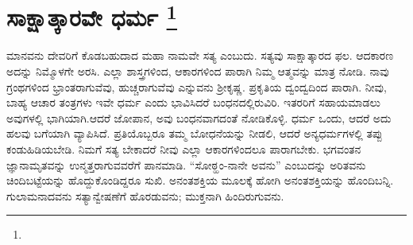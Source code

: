 
\chapter[ಸಾಕ್ಷಾತ್ಕಾರವೇ ಧರ್ಮ ]{ಸಾಕ್ಷಾತ್ಕಾರವೇ ಧರ್ಮ \protect\footnote{}}

ಮಾನವನು ದೇವರಿಗೆ ಕೊಡಬಹುದಾದ ಮಹಾ ನಾಮವೇ ಸತ್ಯ ಎಂಬುದು. ಸತ್ಯವು ಸಾಕ್ಷಾತ್ಕಾರದ ಫಲ. ಆದಕಾರಣ ಅದನ್ನು ನಿಮ್ಮೊಳಗೇ ಅರಸಿ. ಎಲ್ಲಾ ಶಾಸ್ತ್ರಗಳಿಂದ, ಆಕಾರಗಳಿಂದ ಪಾರಾಗಿ ನಿಮ್ಮ ಆತ್ಮವನ್ನು ಮಾತ್ರ ನೋಡಿ. ನಾವು ಗ್ರಂಥಗಳಿಂದ ಭ್ರಾಂತರಾಗುವೆವು, ಹುಚ್ಚರಾಗುವೆವು ಎನ್ನುವನು ಶ‍್ರೀಕೃಷ್ಣ. ಪ್ರಕೃತಿಯ ದ್ವಂದ್ವದಿಂದ ಪಾರಾಗಿ. ನೀವು, ಬಾಹ್ಯ ಆಚಾರ ತಂತ್ರಗಳು ಇವೇ ಧರ್ಮ ಎಂದು ಭಾವಿಸಿದರೆ ಬಂಧನದಲ್ಲಿರುವಿರಿ. ಇತರರಿಗೆ ಸಹಾಯಮಾಡಲು ಅವುಗಳಲ್ಲಿ ಭಾಗಿಯಾಗಿ.ಆದರೆ ಜೋಪಾನ, ಅವು ಬಂಧನವಾಗದಂತೆ ನೋಡಿಕೊಳ್ಳಿ. ಧರ್ಮ ಒಂದು, ಆದರೆ ಅದು ಹಲವು ಬಗೆಯಾಗಿ ವ್ಯಾಪಿಸಿದೆ. ಪ್ರತಿಯೊಬ್ಬರೂ ತಮ್ಮ ಬೋಧನೆಯನ್ನು ನೀಡಲಿ, ಆದರೆ ಅನ್ಯಧರ್ಮಗಳಲ್ಲಿ ತಪ್ಪು ಕಂಡುಹಿಡಿಯಬೇಡಿ. ನಿಮಗೆ ಸತ್ಯ ಬೇಕಾದರೆ ನೀವು ಎಲ್ಲಾ ಆಕಾರಗಳಿಂದಲೂ ಪಾರಾಗಬೇಕು. ಭಗವಂತನ ಜ್ಞಾನಾಮೃತವನ್ನು ಉನ್ಮತ್ತರಾಗುವವರೆಗೆ ಪಾನಮಾಡಿ. “ಸೋಠ್ಹಂ-ನಾನೇ ಅವನು” ಎಂಬುದನ್ನು ಅರಿತವನು ಚಿಂದಿಬಟ್ಟೆಯನ್ನು ಹೊದ್ದುಕೊಂಡಿದ್ದರೂ ಸುಖಿ. ಅನಂತಶಕ್ತಿಯ ಮೂಲಕ್ಕೆ ಹೋಗಿ ಅನಂತಶಕ್ತಿಯನ್ನು ಹೊಂದಿಬನ್ನಿ. ಗುಲಾಮನಾದವನು ಸತ್ಯಾನ್ವೇಷಣೆಗೆ ಹೊರಡುವನು; ಮುಕ್ತನಾಗಿ ಹಿಂದಿರುಗುವನು.

